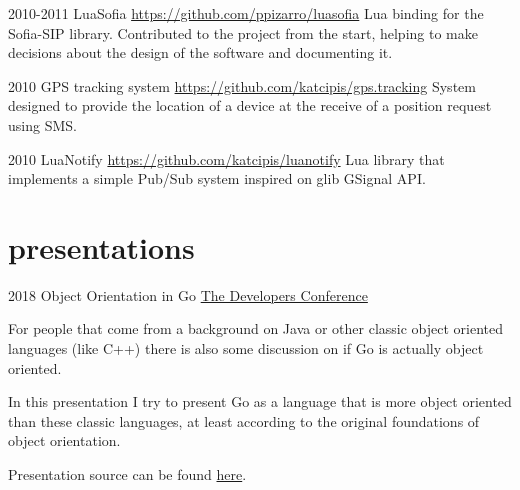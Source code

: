 \documentclass[]{friggeri-cv} %
\begin{document}
\begin{entrylist}
\entry
{2010-2011}
{LuaSofia}
{\href{https://github.com/ppizarro/luasofia}{https://github.com/ppizarro/luasofia}}
{
Lua binding for the Sofia-SIP library.
Contributed to the project from the start,
helping to make decisions about the design of the
software and documenting it.
}
\end{entrylist}

\begin{entrylist}
\entry
{2010}
{GPS tracking system}
{\href{https://github.com/katcipis/gps.tracking}{https://github.com/katcipis/gps.tracking}}
{
System designed to provide the location of a device
at the receive of a position request using SMS.
}
\end{entrylist}

\begin{entrylist}
\entry
{2010}
{LuaNotify}
{\href{https://github.com/katcipis/luanotify}{https://github.com/katcipis/luanotify}}
{
Lua library that implements a simple Pub/Sub system
inspired on glib GSignal API.
}
\end{entrylist}
\pagebreak

\section{presentations}

\begin{entrylist}
\entry
{2018}
{Object Orientation in Go}
{\href{http://www.thedevelopersconference.com.br/tdc/2018/florianopolis/trilha-golang}{The Developers Conference}}
{

For people that come from a background on Java or other classic object oriented languages
(like C++) there is also some discussion on if Go is actually object oriented.

In this presentation I try to present Go as a language that is more object oriented than these
classic languages, at least according to the original foundations of object orientation.

Presentation source can be found \href{https://github.com/katcipis/my.presentations/blob/master/gooo/gooo.slide}{here}.

}
\end{entrylist}
\end{document}
